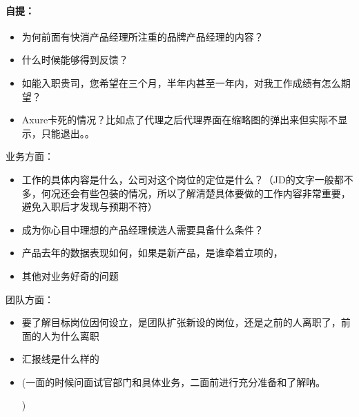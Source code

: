 \documentclass[letterpaper,11pt,english]{sphinxmanual}
\begin{document}
\paragraph{自提：}
\label{\detokenize{chapter_interview/question:id18}}\begin{itemize}
\item {} 
为何前面有快消产品经理所注重的品牌产品经理的内容？

\item {} 
什么时候能够得到反馈？

\item {} 
如能入职贵司，您希望在三个月，半年内甚至一年内，对我工作成绩有怎么期望？
%
\begin{footnote}[806]\sphinxAtStartFootnote
{}
%
\end{footnote}

\item {} 
Axure卡死的情况？比如点了代理之后代理界面在缩略图的弹出来但实际不显示，只能退出。。

\end{itemize}

业务方面：%
\begin{footnote}[807]\sphinxAtStartFootnote
{}
%
\end{footnote}
\begin{itemize}
\item {} 
工作的具体内容是什么，公司对这个岗位的定位是什么？（JD的文字一般都不多，何况还会有些包装的情况，所以了解清楚具体要做的工作内容非常重要，避免入职后才发现与预期不符）

\item {} 
成为你心目中理想的产品经理候选人需要具备什么条件？

\item {} 
产品去年的数据表现如何，如果是新产品，是谁牵着立项的，

\item {} 
其他对业务好奇的问题

\end{itemize}

团队方面：
\begin{itemize}
\item {} 
要了解目标岗位因何设立，是团队扩张新设的岗位，还是之前的人离职了，前面的人为什么离职

\item {} 
汇报线是什么样的

\item {} 
(一面的时候问面试官部门和具体业务，二面前进行充分准备和了解呐。%
\begin{footnote}[808]\sphinxAtStartFootnote
{}
%
\end{footnote})

\end{itemize}
\end{document}
